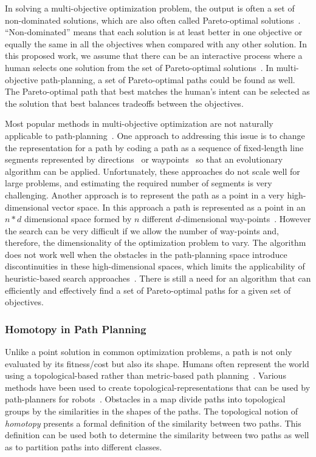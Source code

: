 \documentclass[phd]{byuprop}
\begin{document}
In solving a multi-objective optimization problem, the output is often a set of non-dominated solutions, which are also often called Pareto-optimal solutions~\cite{Miettinen1999}.
``Non-dominated''  means that each solution is at least better in one objective or equally the same in all the objectives when compared with any other solution.
In this proposed work, we assume that there can be an interactive process where a human selects one solution from the set of Pareto-optimal solutions~\cite{Marler2004}.
In multi-objective path-planning, a set of Pareto-optimal paths could be found as well.
The Pareto-optimal path that best matches the human's intent can be selected as the solution that best balances tradeoffs between the objectives.

Most popular methods in multi-objective optimization are not naturally applicable to path-planning~\cite{Zhang2007,Deb2014}.
One approach to addressing this issue is to change the representation for a path by coding a path as a sequence of fixed-length line segments represented by directions~\cite{Ahmed2013,Howlett2006} or waypoints~\cite{Sujit2009,Pires2004} so that an evolutionary algorithm can be applied. 
Unfortunately, these approaches do not scale well for large problems, and estimating the required number of segments is very challenging. 
Another approach is to represent the path as a point in a very high-dimensional vector space.
In this approach a path is represented as a point in an $ n * d $ dimensional space formed by $ n $ different  $d$-dimensional way-points~\cite{Ahmed2011,Ahmed2013}.
However the search can be very difficult if we allow the number of way-points and, therefore, the dimensionality of the optimization problem to vary. 
The algorithm does not work well when the obstacles in the path-planning space introduce discontinuities in these high-dimensional spaces, which limits the applicability of heuristic-based search approaches~\cite{Sujit2009,Zhang2007}.
There is still a need for an algorithm that can efficiently and effectively find a set of Pareto-optimal paths for a given set of objectives.

\subsubsection{Homotopy in Path Planning}
\label{sec:related_work:algorithm_specific_work:homotopy_in_path_planning}

Unlike a point solution in common optimization problems, a path is not only evaluated by its fitness/cost but also its shape.
Humans often represent the world using a topological-based rather than metric-based path planning~\cite{Aginsky1997,kuipers1999}. 
Various methods have been used to create topological-representations that can be used by path-planners for robots~\cite{Mataric1992,Thrun1998,Fasola2013,Shah2013}.
Obstacles in a map divide paths into topological groups by the similarities in the shapes of the paths. 
The topological notion of {\em homotopy} presents a formal definition of the similarity between two paths. 
This definition can be used both to determine the similarity between two paths as well as to partition paths into different classes.
\end{document}

